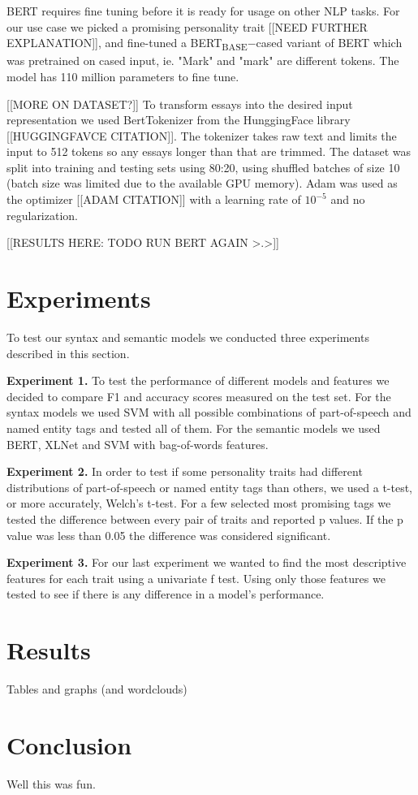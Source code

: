 \documentclass[10pt, a4paper]{article}
\begin{document}
BERT requires fine tuning before it is ready for usage on other NLP tasks. For our use case we picked a promising personality trait [[NEED FURTHER EXPLANATION]], and fine-tuned a BERT\textsubscript{BASE}$-$cased variant of BERT which was pretrained on cased input, ie. "Mark" and "mark" are different tokens. The model has 110 million parameters to fine tune.

[[MORE ON DATASET?]] To transform essays into the desired input representation we used BertTokenizer from the HunggingFace library [[HUGGINGFAVCE CITATION]]. The tokenizer takes raw text and limits the input to 512 tokens so any essays longer than that are trimmed. The dataset was split into training and testing sets using 80:20, using shuffled batches of size 10 (batch size was limited due to the available GPU memory). Adam was used as the optimizer [[ADAM CITATION]] with a learning rate of $10^{-5}$ and no regularization.

[[RESULTS HERE: TODO RUN BERT AGAIN >.>]]

\section{Experiments}
To test our syntax and semantic models we conducted three experiments described in this section.

\textbf{Experiment 1.} To test the performance of different models and features we decided to compare F1 and accuracy scores measured on the test set.
For the syntax models we used SVM with all possible combinations of part-of-speech and named entity tags and tested all of them.
For the semantic models we used BERT, XLNet and SVM with bag-of-words features.

\textbf{Experiment 2.}  In order to test if some personality traits had different distributions of part-of-speech or named entity tags than others, we used a t-test, or more accurately, Welch’s t-test.
For a few selected most promising tags we tested the difference between every pair of traits and reported p values.
If the p value was less than 0.05 the difference was considered significant.

\textbf{Experiment 3.} For our last experiment we wanted to find the most descriptive features for each trait using a univariate f test.
Using only those features we tested to see if there is any difference in a model's performance.

\section{Results}
Tables and graphs (and wordclouds)

\section{Conclusion}
Well this was fun.



\end{document}
